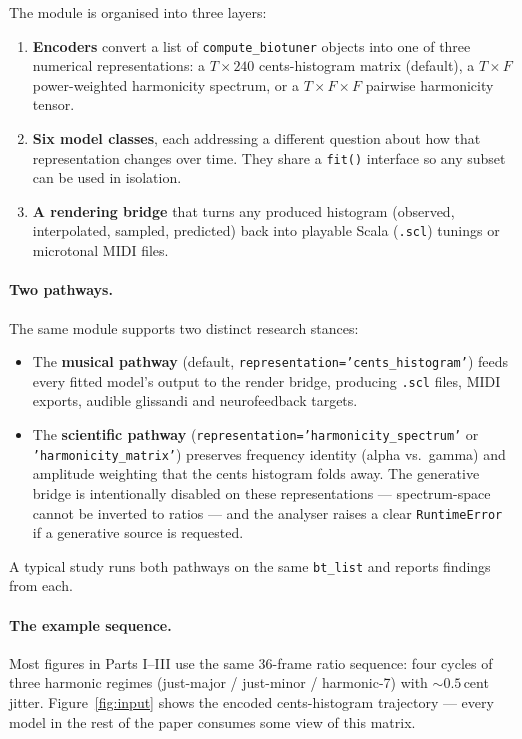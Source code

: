 \documentclass[11pt,a4paper]{article}
\begin{document}
The module is organised into three layers:

\begin{enumerate}[nosep,leftmargin=*]
  \item \textbf{Encoders} convert a list of \texttt{compute\_biotuner}
        objects into one of three numerical representations: a
        $T\times 240$ cents-histogram matrix (default), a $T\times F$
        power-weighted harmonicity spectrum, or a $T\times F\times F$
        pairwise harmonicity tensor.
  \item \textbf{Six model classes}, each addressing a different question
        about how that representation changes over time. They share a
        \texttt{fit()} interface so any subset can be used in isolation.
  \item \textbf{A rendering bridge} that turns any produced histogram
        (observed, interpolated, sampled, predicted) back into playable
        Scala (\texttt{.scl}) tunings or microtonal MIDI files.
\end{enumerate}

\paragraph{Two pathways.}  The same module supports two distinct
research stances:

\begin{itemize}[nosep,leftmargin=*]
  \item The \textbf{musical pathway} (default,
        \texttt{representation='cents\_histogram'}) feeds every fitted
        model's output to the render bridge, producing \texttt{.scl}
        files, MIDI exports, audible glissandi and neurofeedback targets.
  \item The \textbf{scientific pathway}
        (\texttt{representation='harmonicity\_spectrum'} or
        \texttt{'harmonicity\_matrix'}) preserves frequency identity
        (alpha vs.\ gamma) and amplitude weighting that the cents
        histogram folds away. The generative bridge is intentionally
        disabled on these representations --- spectrum-space cannot be
        inverted to ratios --- and the analyser raises a clear
        \texttt{RuntimeError} if a generative source is requested.
\end{itemize}

A typical study runs both pathways on the same \texttt{bt\_list} and
reports findings from each.

\paragraph{The example sequence.}  Most figures in Parts I--III use the
same 36-frame ratio sequence: four cycles of three harmonic regimes
(just-major / just-minor / harmonic-7) with $\sim 0.5$\,cent jitter.
Figure~\ref{fig:input} shows the encoded cents-histogram trajectory ---
every model in the rest of the paper consumes some view of this matrix.
\end{document}
